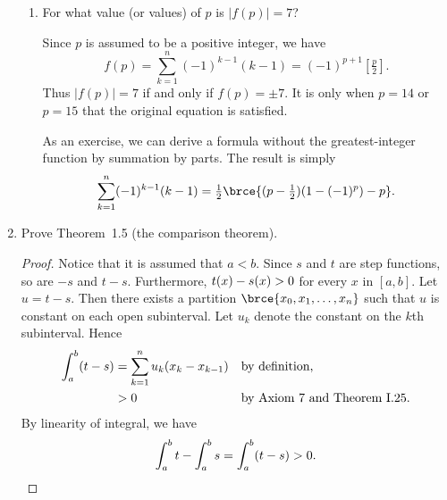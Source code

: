 \documentclass[a4paper]{article}
\begin{document}
\begin{enumerate}
\begin{enumerate}
  \item For what value (or values) of \(p\) is \(|f(p)| = 7\)?

    Since \(p\) is assumed to be a positive integer, we have
    \[
      f(p) = \sum_{k=1}^n (-1)^{k-1}(k-1) = (-1)^{p+1} [\tfrac p2].
    \]
    Thus \(|f(p)| = 7\) if and only if \(f(p) = \pm7\).  It is only
    when \(p = 14\) or \(p = 15\) that the original equation is satisfied.

    As an exercise, we can derive a formula without the greatest-integer
    function by summation by parts.  The result is simply
    \[
      \sum_{k=1}^n (-1)^{k-1}(k-1) = \tfrac12 \brce{(p-\tfrac12)(1-(-1)^p) - p}.
    \]
  \end{enumerate}

\item Prove Theorem~1.5 (the comparison theorem).

  \begin{proof}
    Notice that it is assumed that \(a < b\).  Since \(s\) and \(t\) are
    step functions, so are \(-s\) and \(t-s\).  Furthermore,
    \(\mathop{\relax\kern0pt t}\nolimits(x) - \mathop{\relax\kern0pt s}\nolimits(x) > 0\) for every \(x\) in \([a, b]\).  Let
    \(u = t - s\).  Then there exists a partition
    \(\brce{x_0, x_1, \dotsc, x_n}\) such that \(u\) is constant on each
    open subinterval.  Let \(u_k\) denote the constant on the \(k\)th
    subinterval.  Hence
    \begin{align*}
      \int_a^b (t - s)
        &= \sum_{k=1}^n u_k (x_k - x_{k-1}) && \text{by definition,} \\
        &> 0 && \text{by Axiom~7 and Theorem~I.25.}
    \end{align*}
    By linearity of integral, we have
    \[
      \int_a^b t - \int_a^b s = \int_a^b (t - s) > 0. \qedhere
    \]
  \end{proof}
\end{enumerate}
\end{document}

